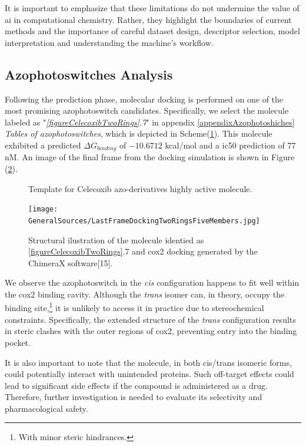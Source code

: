 \documentclass[11pt]{article}
\begin{document}
It is important to emphasize that these limitations do not undermine the value of \gls{ai} in computational chemistry. Rather, they highlight the boundaries of current methods and the importance of careful dataset design, descriptor selection, model interpretation and understanding the machine's workflow.

\subsection{Azophotoswitches Analysis}

Following the prediction phase, molecular docking is performed on one of the most promising azophotoswitch candidates. Specifically, we select the molecule labeled as "\emph{\ref{figureCelecoxibTwoRings}.7}" in appendix \ref{appendixAzophotoshiches} \emph{Tables of azophotoswitches}, which is depicted in Scheme(\ref{figureCelecoxibTwoRingsDoking}). This molecule exhibited a predicted $\Delta G_{binding}$ of $-10.6712$ kcal/mol and a \gls{ic50} prediction of 77 nM. An image of the final frame from the docking simulation is shown in Figure (\ref{figureDockingBestResult}).

\begin{figure}[H]
\captionsetup{type=scheme}
\centering
{}
\caption{Template for Celecoxib azo-derivatives highly active molecule.}
\label{figureCelecoxibTwoRingsDoking}
\end{figure}

\begin{figure}[H]
	\centering
	\texttt{[image: GeneralSources/LastFrameDockingTwoRingsFiveMembers.jpg]}
	\caption{Structural ilustration of the molecule identied as \ref{figureCelecoxibTwoRings}.7 and \gls{cox2} docking generated by the ChimeraX software[15].}
	\label{figureDockingBestResult}
\end{figure}
We observe the azophotoswitch in the \emph{cis} configuration happens to fit well within the \gls{cox2} binding cavity. Although the \emph{trans} isomer can, in theory, occupy the binding site,\footnote{With minor steric hindrances.} it is unlikely to access it in practice due to stereochemical constraints. Specifically, the extended structure of the \emph{trans} configuration results in steric clashes with the outer regions of \gls{cox2}, preventing entry into the binding pocket.

It is also important to note that the molecule, in both cis/trans isomeric forms, could potentially interact with unintended proteins. Such off-target effects could lead to significant side effects if the compound is administered as a drug. Therefore, further investigation is needed to evaluate its selectivity and pharmacological safety.
\end{document}
